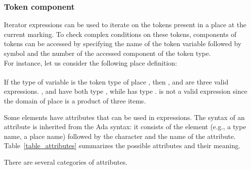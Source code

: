 \setdef


\subsubsection{Token component}
Iterator expressions can be used to iterate on the tokens present in a
place at the current marking.  To check complex conditions on these
tokens, components of tokens can be accessed by specifying the name of
the token variable followed by symbol \LS{->} and the number of the
accessed component of the token type.\\
For instance, let us consider the following place
definition:\\
\\
If the type of variable  is the token type of place , then
,  and  are three valid expressions.
, and  have both type , while  has
type .   is not a valid expression since the domain
of place  is a product of three items.\\

\tokencomponentdef


Some elements have attributes that can be used in expressions.  The
syntax of an attribute is inherited from the Ada syntax: it consists
of the element (e.g., a type name, a place name) followed by the
character  and the name of the attribute.
Table~\ref{table_attributes} summarizes the possible attributes and
their meaning.

There are several categories of attributes.

